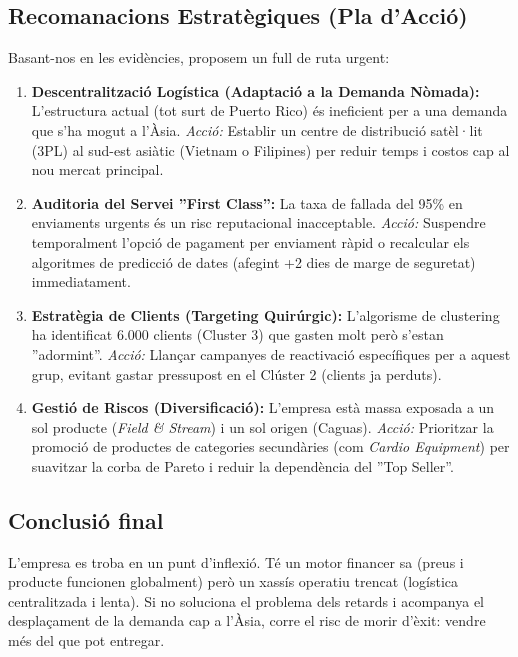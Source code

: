 \documentclass[12pt,a4paper]{article}
\begin{document}
\subsection{Recomanacions Estratègiques (Pla d'Acció)}
Basant-nos en les evidències, proposem un full de ruta urgent:

\begin{enumerate}
    \item \textbf{Descentralització Logística (Adaptació a la Demanda Nòmada):}
    L'estructura actual (tot surt de Puerto Rico) és ineficient per a una demanda que s'ha mogut a l'Àsia. 
    \textit{Acció:} Establir un centre de distribució satèl·lit (3PL) al sud-est asiàtic (Vietnam o Filipines) per reduir temps i costos cap al nou mercat principal.
    
    \item \textbf{Auditoria del Servei ''First Class'':}
    La taxa de fallada del 95\% en enviaments urgents és un risc reputacional inacceptable.
    \textit{Acció:} Suspendre temporalment l'opció de pagament per enviament ràpid o recalcular els algoritmes de predicció de dates (afegint +2 dies de marge de seguretat) immediatament.
    
    \item \textbf{Estratègia de Clients (Targeting Quirúrgic):}
    L'algorisme de clustering ha identificat 6.000 clients (Cluster 3) que gasten molt però s'estan ''adormint''.
    \textit{Acció:} Llançar campanyes de reactivació específiques per a aquest grup, evitant gastar pressupost en el Clúster 2 (clients ja perduts).
    
    \item \textbf{Gestió de Riscos (Diversificació):}
    L'empresa està massa exposada a un sol producte (\textit{Field \& Stream}) i un sol origen (Caguas).
    \textit{Acció:} Prioritzar la promoció de productes de categories secundàries (com \textit{Cardio Equipment}) per suavitzar la corba de Pareto i reduir la dependència del ''Top Seller''.
\end{enumerate}

\subsection{Conclusió final}
L'empresa es troba en un punt d'inflexió. Té un motor financer sa (preus i producte funcionen globalment) però un xassís operatiu trencat (logística centralitzada i lenta). Si no soluciona el problema dels retards i acompanya el desplaçament de la demanda cap a l'Àsia, corre el risc de morir d'èxit: vendre més del que pot entregar.
\end{document}
